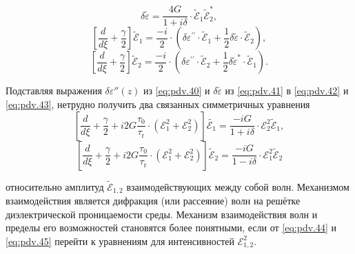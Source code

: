 \begin{equation}
	\label{eq:pdv.41}
	\delta \tilde{\varepsilon}=\frac{4 G}{1+i \delta} \cdot \tilde{\mathcal{E}}_{1} \tilde{\mathcal{E}}_{2}^{*},
\end{equation}
\begin{equation}
	\label{eq:pdv.42}
	\left[\frac{d}{d \xi}+\frac{\gamma}{2}\right] \tilde{\mathcal{E}}_{1}=\frac{-i}{2} \cdot\left(\delta \varepsilon^{\prime \prime} \cdot \tilde{\mathcal{E}}_{1}+\frac{1}{2} \delta \tilde{\varepsilon} \cdot \tilde{\mathcal{E}}_{2}\right),
\end{equation}
\begin{equation}
	\label{eq:pdv.43}
	\left[\frac{d}{d \xi}+\frac{\gamma}{2}\right] \tilde{\mathcal{E}}_{2}=\frac{-i}{2} \cdot\left(\delta \varepsilon^{\prime \prime} \cdot \tilde{\mathcal{E}}_{2}+\frac{1}{2} \delta \tilde{\varepsilon}^{*} \cdot \tilde{\mathcal{E}}_{1}\right).
\end{equation}

Подставляя выражения $\delta \varepsilon'' (z)$ из \eqref{eq:pdv.40} и $\delta \tilde{\varepsilon}$ из \eqref{eq:pdv.41} в \eqref{eq:pdv.42} и \eqref{eq:pdv.43}, нетрудно получить два связанных симметричных уравнения 
\begin{equation}
	\label{eq:pdv.44}
	\left[\frac{d}{d \xi}+\frac{\gamma}{2}+i 2 G \frac{\tau_{0}}{\tau_{\mathrm{r}}} \cdot\left({\mathcal { E }}_{1}^{2}+{\mathcal { E }}_{2}^{2}\right)\right] \tilde{\mathcal{E}_{1}}=\frac{-i G}{1+i \delta} \cdot \mathcal{E}_{2}^{2} \tilde{\mathcal{E}}_{1},
\end{equation}
\begin{equation}
	\label{eq:pdv.45}
	\left[\frac{d}{d \xi}+\frac{\gamma}{2}+i 2 G \frac{\tau_{0}}{\tau_{\mathrm{r}}} \cdot\left({\mathcal { E }}_{1}^{2}+{\mathcal { E }}_{2}^{2}\right)\right] \tilde{\mathcal{E}}_{2}=\frac{-i G}{1-i \delta} \cdot \mathcal{E}_{1}^{2} \tilde{\mathcal{E}}_{2}
\end{equation}

относительно амплитуд $\tilde{\mathcal{E}}_{1,2}$ взаимодействующих между собой волн. Механизмом взаимодействия является дифракция (или рассеяние) волн на решётке диэлектрической проницаемости среды. Механизм взаимодействия волн и пределы его возможностей становятся более понятными, если от \eqref{eq:pdv.44} и \eqref{eq:pdv.45} перейти к уравнениям для интенсивностей ${\mathcal{E}}_{1,2}^2$.


